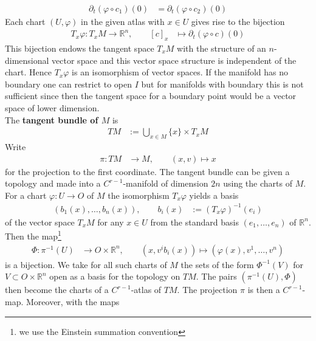 \begin{align*}
  \partial_{t}
  (\varphi \circ c_{1})(0)
  &=
  \partial_{t}
  (\varphi \circ c_{2})(0)
\end{align*}
Each chart $(U,\varphi)$ in the given atlas with $x \in U$ gives rise to the bijection
\begin{align*}
  T_{x}\varphi
  \colon
  T_{x}M
  \to
  \mathbb{R}^{n}
  ,\qquad
  [c]_{x}
  &\mapsto
  \partial_{t}
  (\varphi \circ c)(0)
\end{align*}
This bijection endows the tangent space $T_{x}M$ with the structure of an $n$-dimensional vector space and this vector space structure is independent of the chart. Hence $T_{x}\varphi$ is an isomorphism of vector spaces. If the manifold has no boundary one can restrict to open $I$ but for manifolds with boundary this is not sufficient since then the tangent space for a boundary point would be a vector space of lower dimension.
\\
The \textbf{tangent bundle of $M$} is
\begin{align*}
  TM
  &:=
  \bigcup_{x \in M}
  \lbrace
    x
  \rbrace
  \times
  T_{x}M
\end{align*}
Write
\begin{align*}
  \pi
  \colon
  TM
  &\to
  M
  ,\qquad
  (x,v)
  \mapsto
  x
\end{align*}
for the projection to the first coordinate. The tangent bundle can be given a topology and made into a $C^{r-1}$-manifold of dimension $2n$ using the charts of $M$. For a chart $\varphi \colon U \to O$ of $M$ the isomorphism $T_{x}\varphi$ yields a basis
\begin{align*}
  \left(
    b_{1}(x)
    ,
    \ldots
    ,
    b_{n}(x)
  \right)
  ,\qquad
  b_{i}(x)
  &:=
  (T_{x}\varphi)^{-1}(e_{i})
\end{align*}
of the vector space $T_{x}M$ for any $x \in U$ from the standard basis $(e_{1},\ldots,e_{n})$ of $\mathbb{R}^{n}$. Then the map\footnote{we use the Einstein summation convention}
\begin{align*}
  \Phi
  \colon
  \pi^{-1}(U)
  &\to
  O
  \times
  \mathbb{R}^{n}
  ,\qquad
  \left(
    x
    ,
    v^{i}
    b_{i}(x)
  \right)
  \mapsto
  \left(
    \varphi(x)
    ,
    v^{1}
    ,
    \ldots
    ,
    v^{n}
  \right)
\end{align*}
is a bijection. We take for all such charts of $M$ the sets of the form $\Phi^{-1}(V)$ for $V \subset O \times \mathbb{R}^{n}$ open as a basis for the topology on $TM$. The pairs $(\pi^{-1}(U),\Phi)$ then become the charts of a $C^{r-1}$-atlas of $TM$. The projection $\pi$ is then a $C^{r-1}$-map. Moreover, with the maps
